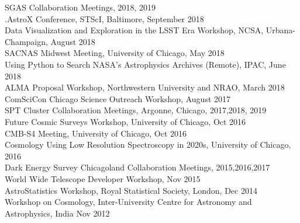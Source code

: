 \documentclass[margin]{res}
\begin{document}
\begin{resume}
SGAS Collaboration Meetings, 2018, 2019\\
.AstroX Conference, STScI, Baltimore, September 2018\\
Data Visualization and Exploration in the LSST Era Workshop, NCSA, Urbana-Champaign, August 2018\\
SACNAS Midwest Meeting, University of Chicago, May 2018\\
Using Python to Search NASA's Astrophysics Archives (Remote), IPAC, June 2018\\
ALMA Proposal Workshop, Northwestern University and NRAO, March 2018\\
ComSciCon Chicago Science Outreach Workshop, August 2017\\
SPT Cluster Collaboration Meetings, Argonne, Chicago, 2017,2018, 2019\\
Future Cosmic Surveys Workshop, University of Chicago, Oct 2016\\
CMB-S4 Meeting, University of Chicago, Oct 2016\\
Cosmology Using Low Resolution Spectroscopy in 2020s, University of Chicago, 2016\\
Dark Energy Survey Chicagoland Collaboration Meetings, 2015,2016,2017\\
World Wide Telescope Developer Workshop, Nov 2015\\
AstroStatistics Workshop, Royal Statistical Society, London, Dec 2014\\
Workshop on Cosmology, Inter-University Centre for Astronomy and Astrophysics, India Nov 2012


\end{resume}
\end{document}
